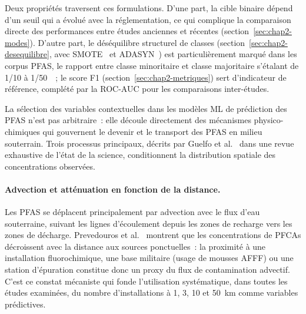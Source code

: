 Deux propri\'et\'es traversent ces formulations.
D'une part, la cible binaire d\'epend d'un seuil qui a \'evolu\'e avec la r\'eglementation, ce qui complique la comparaison directe des performances entre \'etudes anciennes et r\'ecentes (section~\ref{sec:chap2-modes}).
D'autre part, le d\'es\'equilibre structurel de classes (section~\ref{sec:chap2-desequilibre}, avec SMOTE~\cite{chawla2002smote} et ADASYN~\cite{he2008adasyn}) est particuli\`erement marqu\'e dans les corpus PFAS, le rapport entre classe minoritaire et classe majoritaire s'\'etalant de 1/10 \`a 1/50~\cite{dong2024pfas}~; le score F1 (section~\ref{sec:chap2-metriques}) sert d'indicateur de r\'ef\'erence, compl\'et\'e par la ROC-AUC pour les comparaisons inter-\'etudes.

\label{sec:chap2-transport}

La s\'election des variables contextuelles dans les mod\`eles ML de pr\'ediction des PFAS n'est pas arbitraire~: elle d\'ecoule directement des m\'ecanismes physico-chimiques qui gouvernent le devenir et le transport des PFAS en milieu souterrain.
Trois processus principaux, d\'ecrits par Guelfo et al.~\cite{guelfo2021pfas} dans une revue exhaustive de l'\'etat de la science, conditionnent la distribution spatiale des concentrations observ\'ees.

\paragraph{Advection et att\'enuation en fonction de la distance.}
Les PFAS se d\'eplacent principalement par advection avec le flux d'eau souterraine, suivant les lignes d'\'ecoulement depuis les zones de recharge vers les zones de d\'echarge.
Prevedouros et al.~\cite{prevedouros2006pfas} montrent que les concentrations de PFCAs d\'ecroissent avec la distance aux sources ponctuelles~: la proximit\'e \`a une installation fluorochimique, une base militaire (usage de mousses AFFF) ou une station d'\'epuration constitue donc un proxy du flux de contamination advectif.
C'est ce constat m\'ecaniste qui fonde l'utilisation syst\'ematique, dans toutes les \'etudes examin\'ees, du nombre d'installations \`a 1, 3, 10 et 50~km comme variables pr\'edictives.


